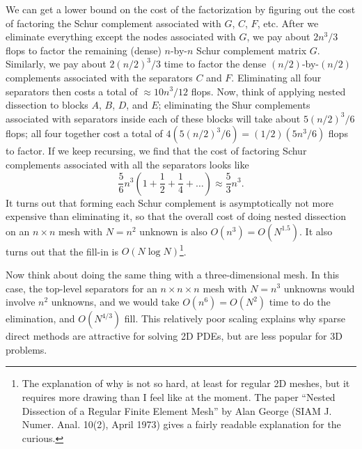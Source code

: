 We can get a lower bound on the cost of the factorization by figuring
out the cost of factoring the Schur complement associated with $G$,
$C$, $F$, etc.  After we eliminate everything except the nodes
associated with $G$, we pay about $2n^3/3$ flops to factor the
remaining (dense) $n$-by-$n$ Schur complement matrix $G$.  Similarly,
we pay about $2(n/2)^3/3$ time to factor the dense $(n/2)$-by-$(n/2)$
complements associated with the separators $C$ and $F$.  Eliminating
all four separators then costs a total of $\approx 10n^3/12$ flops.
Now, think of applying nested dissection to blocks $A$, $B$, $D$, and
$E$; eliminating the Shur complements associated with separators
inside each of these blocks will take about $5(n/2)^3/6$ flops; all
four together cost a total of $4 ( 5(n/2)^3/6 )= (1/2)
(5n^3/6)$ flops to factor.  If we keep recursing, we find that the
cost of factoring Schur complements associated with all the separators
looks like
\[
  \frac{5}{6} n^3 \left( 1 + \frac{1}{2} + \frac{1}{4} + \ldots \right)
  \approx \frac{5}{3}n^3.
\]
It turns out that forming each Schur complement is asymptotically not
more expensive than eliminating it, so that the overall cost of doing
nested dissection on an $n \times n$ mesh with $N = n^2$ unknown is also
$O(n^3) = O(N^{1.5})$.  It also turns out that the fill-in is
$O(N \log N)$\footnote{
  The explanation of why is not so hard, at least for regular 2D meshes,
  but it requires more drawing than I feel like at the moment.  The paper
  ``Nested Dissection of a Regular Finite Element Mesh'' by Alan George
  (SIAM J. Numer. Anal. 10(2), April 1973) gives a fairly readable explanation
  for the curious.
}.

Now think about doing the same thing with a three-dimensional mesh.
In this case, the top-level separators for an $n \times n \times n$ mesh
with $N = n^3$ unknowns would involve $n^2$ unknowns, and we would take
$O(n^6) = O(N^2)$ time to do the elimination, and $O(N^{4/3})$ fill.
This relatively poor scaling explains why sparse direct methods are attractive
for solving 2D PDEs, but are less popular for 3D problems.

